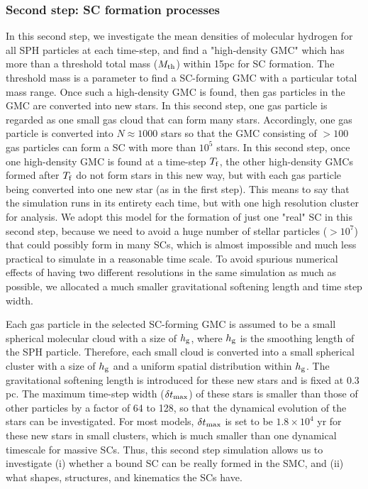 \documentclass[fleqn,usenatbib]{mnras}
\begin{document}
\subsubsection{Second step: SC formation processes}

In this second step, we investigate the mean densities of molecular hydrogen for all SPH particles at each time-step, and find a "high-density GMC" which has more than a threshold total mass ($M_{\rm th}$)
within 15pc for SC formation.
The threshold mass is a parameter to find a SC-forming GMC with a particular total mass range.
Once such a high-density GMC is found, then gas particles in the GMC
are converted into new stars. In this second step, one gas particle is regarded as one small gas cloud that can form many stars. Accordingly,
one gas particle is converted into $N \approx 1000$ stars so that the GMC consisting of $>100$ gas particles can form a SC with more than $10^5$ stars.
In this second step, once one high-density GMC is found at a time-step $T_{\rm f}$, the other high-density GMCs formed after $T_{\rm f}$ do not form stars in this new way, but with each gas particle being converted into one new star (as in the first step). This means to say that the simulation runs in its entirety each time, but with one high resolution cluster for analysis.
We adopt this model for the formation of just one "real" SC in this second step, because we need to avoid a huge number of stellar particles ($>10^7$) that could possibly form in many SCs, which is almost impossible
and much less practical to simulate in a reasonable
time scale. To avoid spurious numerical effects of having two different resolutions in the same simulation as much as possible, we allocated a much smaller gravitational softening length and time step width.




Each gas particle in the selected SC-forming GMC is assumed to be a small
spherical molecular cloud with a size of $h_{\rm g}$, where $h_{\rm g}$ is the
smoothing length of the SPH particle. Therefore,
each small cloud is converted into a small spherical cluster with
a size of $h_{\rm g}$ and a uniform spatial distribution within $h_{\rm g}$. The gravitational softening length is introduced for these new stars and is fixed at 0.3 pc. The maximum time-step width ($\delta t_{\rm max}$)  of these stars is smaller than those of other particles by a factor of 64 to 128, so that the dynamical evolution of the stars can be investigated.
For most models, $\delta t_{\rm max}$ is set to be $1.8 \times 10^4$ yr for these new stars in small clusters, which is much smaller than one dynamical
timescale for massive SCs.
Thus, this second step simulation allows us to investigate (i) whether 
a bound SC can be really formed in the SMC,
and (ii) what shapes, structures, and kinematics the SCs have.
\end{document}
